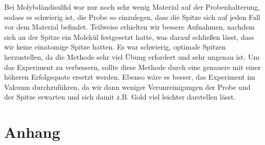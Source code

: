 \documentclass[12pt,listof=totoc]{scrartcl}
\begin{document}
Bei Molybdändisulfid war nur noch sehr wenig Material auf der Probenhalterung, sodass es schwierig ist, die Probe so einzulegen, dass die Spitze sich auf jeden Fall vor dem Material befindet. Teilweise erhielten wir bessere Aufnahmen, nachdem sich an der Spitze ein Molekül festgesetzt hatte, was darauf schließen lässt, dass wir keine einatomige Spitze hatten. Es war schwierig, optimale Spitzen herzustellen, da die Methode sehr viel Übung erfordert und sehr ungenau ist. Um das Experiment zu verbessern, sollte diese Methode durch eine genauere mit einer höheren Erfolgsquote ersetzt werden. Ebenso wäre es besser, das Experiment im Vakuum durchzuführen, da wir dann weniger Verunreinigungen der Probe und der Spitze erwarten und sich damit z.B. Gold viel leichter darstellen lässt.

\newpage
\section{Anhang}
\end{document}
